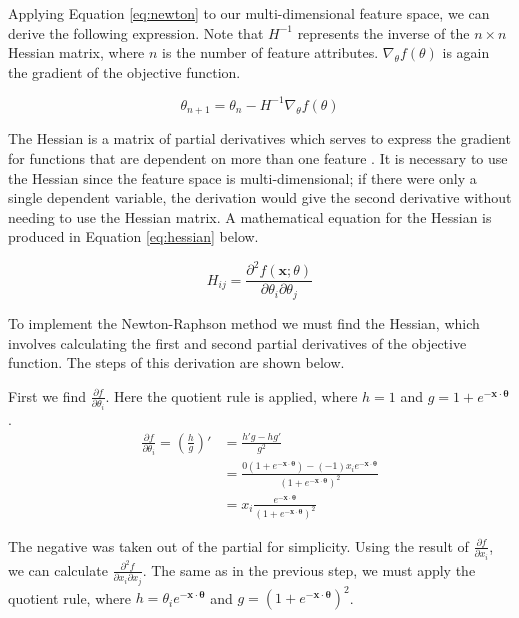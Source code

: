 \documentclass[letterpaper]{article} %
\begin{document}
Applying Equation \ref{eq:newton} to our multi-dimensional feature space,
we can derive the following expression.
Note that $H^{-1}$ represents the inverse of the $n \times n$ Hessian matrix,
where $n$ is the number of feature attributes.
$\nabla_{\theta}f(\theta)$ is again the gradient of the objective function.

$$\theta_{n+1} = \theta_n - H^{-1}\nabla_{\theta}f(\theta)$$

The Hessian is a matrix of partial derivatives which serves to express
the gradient for functions that are dependent on more than one feature \cite{notes}.
It is necessary to use the Hessian
since the feature space is multi-dimensional; if there were only a single dependent variable,
the derivation would give the second derivative without needing to use the Hessian matrix.
A mathematical equation for the Hessian is produced in Equation \ref{eq:hessian} below.

\begin{equation}
\label{eq:hessian}
H_{ij} = \frac{\partial^2f(\mathbf{x};\theta)}{\partial\theta_i\partial\theta_j}
\end{equation}

To implement the Newton-Raphson method we must
find the Hessian, which involves
calculating the first and second partial derivatives of the objective function.
The steps of this derivation are shown below.

First we find $\frac{\partial f}{\partial\theta_i}$.
Here the quotient rule is applied, where $h = 1$ and $g = 1 + e^{-\mathbf{x\cdot\theta}}$.
\begin{align*}
\frac{\partial f}{\partial\theta_i} = (\frac{h}{g})' &= \frac{h'g - hg'}{g^2} \\
    &= \frac{0(1 + e^{-\mathbf{x\cdot\theta}})
       - (-1)x_ie^{-\mathbf{x\cdot\theta}}}
            {(1 + e^{-\mathbf{x\cdot\theta}})^2} \\
    &= x_i\frac{e^{-\mathbf{x\cdot\theta}}}
            {(1 + e^{-\mathbf{x\cdot\theta}})^2}
\end{align*}

The negative was taken out of the partial for simplicity.
Using the result of $\frac{\partial f}{\partial x_i}$,
we can calculate $\frac{\partial^2 f}{\partial x_i\partial x_j}$.
The same as in the previous step, we must apply the quotient rule, where
$h = \theta_ie^{-\mathbf{x\cdot\theta}}$ and
$g = (1 + e^{-\mathbf{x\cdot\theta}})^2$.
\end{document}
